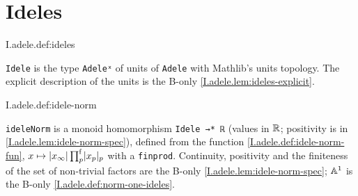 \section{Ideles}

\begin{definition}[ideles]
\end{definition}
\begin{tfformal}{I.adele.def:ideles}
\begin{tffidelity}
\texttt{Idele} is the type \texttt{Adeleˣ} of units of \texttt{Adele} with Mathlib's units topology. The explicit description of the units is the B-only \cref{I.adele.lem:ideles-explicit}.
\end{tffidelity}
\end{tfformal}

\begin{definition}
\end{definition}
\begin{tfformal}{I.adele.def:idele-norm}
\begin{tffidelity}
\texttt{ideleNorm} is a monoid homomorphism \texttt{Idele →* ℝ} (values in $\mathbb{R}$; positivity is in \cref{I.adele.lem:idele-norm-spec}), defined from the function \cref{I.adele.def:idele-norm-fun}, $x\mapsto\lvert x_\infty\rvert\prod^{\mathrm f}_p\lvert x_p\rvert_p$ with a \texttt{finprod}. Continuity, positivity and the finiteness of the set of non-trivial factors are the B-only \cref{I.adele.lem:idele-norm-spec}; $\mathbb{A}^1$ is the B-only \cref{I.adele.def:norm-one-ideles}.
\end{tffidelity}
\end{tfformal}

